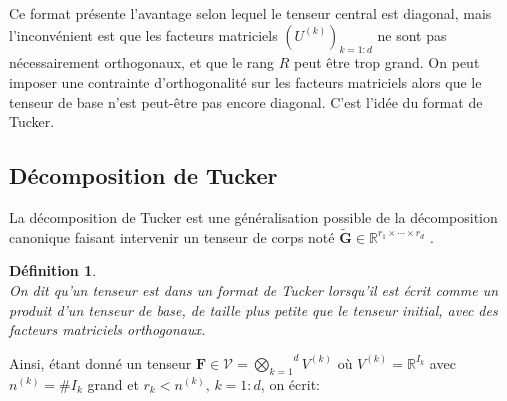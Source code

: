 \documentclass[11pt,a4paper,oneside]{book}
\newtheorem{defi}{Définition}[chapter]
\def\R{\mathbb R}
\def\gktensor{\overset{d}{\underset{k=1}{\bigotimes}}}
\newcommand{\propref}[1]{\textsc{Proposition}~\ref{#1}}
\begin{document}
%

Ce format présente l'avantage selon lequel le tenseur central est diagonal, mais l'inconvénient est que les facteurs matriciels $(U^{(k)})_{k=1:d}$ ne sont pas nécessairement orthogonaux, et que le rang $ R $ peut être trop grand. On peut imposer une contrainte d'orthogonalité sur les facteurs matriciels alors que le tenseur de base n'est peut-être pas encore diagonal. C'est l'idée du format de Tucker.
\subsection{Décomposition de Tucker}
\label{DefFormatTucker}
La décomposition de Tucker est une généralisation possible de la
décomposition canonique faisant intervenir un tenseur de corps noté $ \tilde{\mathbf{G}}\in\R^{r_{1}\times\cdots\times r_{d}} $ \cite[p.60]{olivier2017decompositions}.
\begin{defi}
\emph{\\}
On dit qu'un tenseur est dans un \textit{format de Tucker} lorsqu'il est écrit comme un produit d'un tenseur de base, de taille plus petite que le tenseur initial, avec des facteurs matriciels orthogonaux.
\end{defi}
 Ainsi, étant donné un tenseur $\mathbf{F} \in \mathcal{V} = \gktensor V^{(k)}$ où $ V^{(k)} = \mathbb{R}^{I_k}$ avec $n^{(k)} = \#I_k$ grand et $r_{k}< n^{(k)},\,k=1:d$, on écrit:\\
\end{document}
